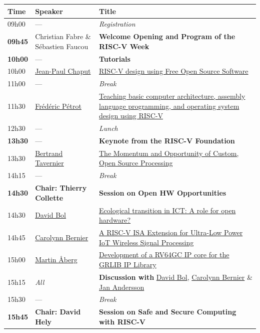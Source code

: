 \documentclass[a4paper, 10pt]{article}
\begin{document}
\begin{center}
\begin{tabular}{l|p{4cm}|p{11cm}}
\hline
Time & Speaker & Title\\
\hline
09h00 & --- & \emph{Registration}\\
\hline
\textbf{09h45} & Christian Fabre \& Sébastien Faucou & \textbf{Welcome Opening and Program of the RISC-V Week}\\
\hline
\textbf{10h00} & --- & \textbf{Tutorials}\\
\hline
10h00 & \hyperref[sec:org39da51d]{Jean-Paul Chaput} & \hyperref[sec:org39da51d]{RISC-V design using Free Open Source Software}\\
\hline
11h00 & --- & \emph{Break}\\
\hline
11h30 & \hyperref[sec:orged882b9]{Frédéric Pétrot} & \hyperref[sec:orged882b9]{Teaching basic computer architecture, assembly language programming, and operating system design using RISC-V}\\
\hline
12h30 & --- & \emph{Lunch}\\
\hline
\textbf{13h30} & --- & \textbf{Keynote from the RISC-V Foundation}\\
\hline
13h30 & \hyperref[sec:orgf6daae1]{Bertrand Tavernier} & \hyperref[sec:orgf6daae1]{The Momentum and Opportunity of Custom, Open Source Processing}\\
\hline
14h15 & --- & \emph{Break}\\
\hline
\textbf{14h30} & \textbf{Chair: Thierry Collette} & \textbf{Session on Open HW Opportunities}\\
\hline
14h30 & \hyperref[sec:org6c5e3e2]{David Bol} & \hyperref[sec:org6c5e3e2]{Ecological transition in ICT: A role for open hardware?}\\
14h45 & \hyperref[sec:orgcd043a0]{Carolynn Bernier} & \hyperref[sec:orgcd043a0]{A RISC-V ISA Extension for Ultra-Low Power IoT Wireless Signal Processing}\\
15h00 & \hyperref[sec:orgd12d66c]{Martin Åberg} & \hyperref[sec:orgd12d66c]{Development of a RV64GC IP core for the GRLIB IP Library}\\
15h15 & \emph{All} & \textbf{Discussion with} \hyperref[sec:org6c5e3e2]{David Bol}, \hyperref[sec:orgcd043a0]{Carolynn Bernier} \& \hyperref[sec:orgd12d66c]{Jan Andersson}\\
\hline
15h30 & --- & \emph{Break}\\
\hline
\textbf{15h45} & \textbf{Chair: David Hely} & \textbf{Session on Safe and Secure Computing with RISC-V}\\

\end{tabular}
\end{center}
\end{document}
